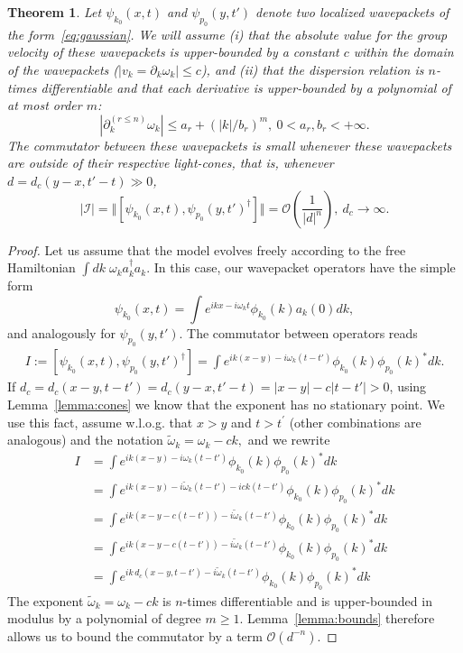 \documentclass[notitlepage, prx, preprint, amsmath,superscriptaddress,amssymb]{revtex4-1}
\newtheorem{theorem}{Theorem}[section]
\begin{document}
\begin{theorem}
\label{th:free-causality}
Let $\psi_{k_0}(x,t)$ and $\psi_{p_0}(y,t')$ denote two localized wavepackets of the form\ \eqref{eq:gaussian}. We will assume (i) that the  absolute value for the group velocity of these wavepackets is upper-bounded by a constant $c$ within the domain of the wavepackets ($\vert  v_k = \partial_k \omega_k \vert  \leq c$), and (ii) that the dispersion relation is $n$-times differentiable and that each derivative is upper-bounded by a polynomial of at most order $m$:
\begin{equation}
|\partial^{(r\leq n)}_k\omega_k|\leq a_r + (|k|/b_r)^m,~0< a_r,b_r<+\infty.
\end{equation}
The commutator between these wavepackets is small whenever these wavepackets are outside of their respective light-cones, that is, whenever $d=d_c(y-x,t'-t)\gg 0$, 
\begin{equation}
|\mathcal{I}|=\Vert[\psi_{k_0}(x,t),\psi_{p_0}(y,t')^\dagger]\Vert =
\mathcal{O}\left(\frac{1}{|d|^n}\right),~d_c\to\infty.
\end{equation}
\end{theorem}

\begin{proof}
Let us assume that the model evolves freely according to the free Hamiltonian
$\int d k \; \omega_k a_k^\dagger a_k$.
In this case, our wavepacket operators have the simple form
\begin{equation}
\psi_{k_0}(x,t) = \int  e^{ikx-i\omega_kt} \phi_{k_0}(k) a_k(0) dk,
\end{equation}
and analogously for $\psi_{p_0}(y,t')$. The commutator between operators reads
\begin{align}
I:=[\psi_{k_0}(x,t),\psi_{p_0}(y,t')^\dagger] =
\int e^{ik(x-y)-i\omega_k(t-t')} \phi_{k_0}(k)\phi_{p_0}(k)^*dk.
\label{eq:free-com}
\end{align}
If $d_c= d_c(x-y,t-t')  = d_c(y-x,t'-t) = |x-y| -c|t-t'|   > 0$, using Lemma\ \ref{lemma:cones} we know that the exponent has no stationary point. We use this fact, assume w.l.o.g.  that $x>y$ and $t>t^\prime$ (other combinations are analogous) and the notation  $\tilde\omega_k = \omega_k -c k,$ and we rewrite
\begin{align*}
I&= \int  e^{ik(x-y)-i\omega_k(t-t')}  \phi_{k_0}(k)\phi_{p_0}(k)^*dk\\
&= \int  e^{ik(x-y)-i\tilde\omega_k(t-t') - ick(t-t')}  \phi_{k_0}(k)\phi_{p_0}(k)^*dk\\
&= \int  e^{ik(x-y-c(t-t'))-i\tilde\omega_k(t-t')}  \phi_{k_0}(k)\phi_{p_0}(k)^*dk\\
&= \int  e^{ik(x-y-c(t-t'))-i\tilde\omega_k(t-t')}  \phi_{k_0}(k)\phi_{p_0}(k)^*dk\\
&=\int e^{ik\,  d_c(x-y, t-t')-i\tilde\omega_k(t-t')} \phi_{k_0}(k)\phi_{p_0}(k)^*dk
\end{align*}
The exponent $\tilde\omega_k = \omega_k -c k$ is $n$-times differentiable and is upper-bounded in modulus by a polynomial of degree $m\geq 1$. Lemma\ \ref{lemma:bounds} therefore allows us to bound the commutator by a term $\mathcal{O}(d^{-n})$.
\end{proof}
\end{document}
